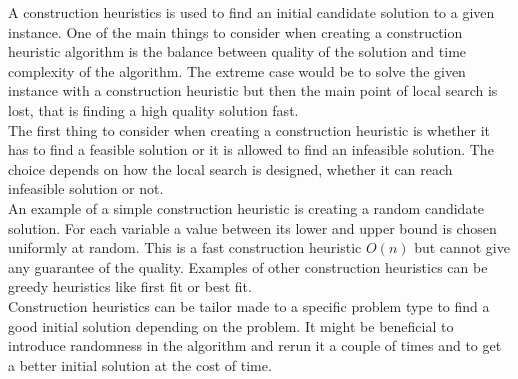 A construction heuristics is used to find an initial candidate solution to a given instance. One of the main things to 
consider when creating a construction heuristic algorithm is the balance between quality of the solution and time 
complexity of the algorithm. The extreme case would be to solve the given instance with a construction heuristic but 
then the main point of local search is lost, that is finding a high quality solution fast. \\ 
The first thing to consider when creating a construction heuristic is whether it has to find a feasible solution or it 
is allowed to find an infeasible solution. The choice depends on how the local search is designed, whether it can reach 
infeasible solution or not. \\ 
An example of a simple construction heuristic is creating a random candidate solution. For each variable a value 
between its lower and upper bound is chosen uniformly at random. This is a fast construction heuristic $O(n)$ but 
cannot give any guarantee of the quality. Examples of other construction heuristics can be greedy heuristics like first 
fit or best fit. \\ 
Construction heuristics can be tailor made to a specific problem type to find a good initial solution depending on the 
problem. It might be beneficial to introduce randomness in the algorithm and rerun it a couple of times and to get a 
better initial solution at the cost of time. 